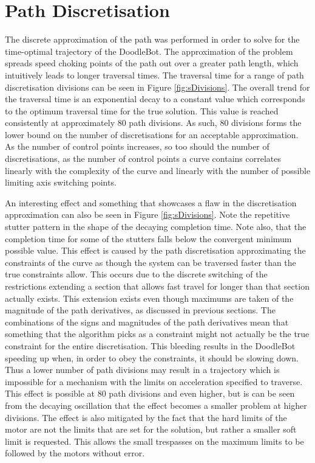 \section{Path Discretisation}
The discrete approximation of the path was performed in order to solve for the time-optimal trajectory of the DoodleBot. The approximation of the problem spreads speed choking points of the path out over a greater path length, which intuitively leads to longer traversal times. The traversal time for a range of path discretisation divisions can be seen in Figure \ref{fig:sDivisions}. The overall trend for the traversal time is an exponential decay to a constant value which corresponds to the optimum traversal time for the true solution. This value is reached consistently at approximately 80 path divisions. As such, 80 divisions forms the lower bound on the number of discretisations for an acceptable approximation. As the number of control points increases, so too should the number of discretisations, as the number of control points a curve contains correlates linearly with the complexity of the curve and linearly with the number of possible limiting axis switching points.

An interesting effect and something that showcases a flaw in the discretisation approximation can also be seen in Figure \ref{fig:sDivisions}. Note the repetitive stutter pattern in the shape of the decaying completion time. Note also, that the completion time for some of the stutters falls below the convergent minimum possible value. This effect is caused by the path discretisation approximating the constraints of the curve as though the system can be traversed faster than the true constraints allow. This occurs due to the discrete switching of the restrictions extending a section that allows fast travel for longer than that section actually exists. This extension exists even though maximums are taken of the magnitude of the path derivatives, as discussed in previous sections. The combinations of the signs and magnitudes of the path derivatives mean that something that the algorithm picks as a constraint might not actually be the true constraint for the entire discretisation. This bleeding results in the DoodleBot speeding up when, in order to obey the constraints, it should be slowing down. Thus a lower number of path divisions may result in a trajectory which is impossible for a mechanism with the limits on acceleration specified to traverse. This effect is possible at 80 path divisions and even higher, but is can be seen from the decaying oscillation that the effect becomes a smaller problem at higher divisions. The effect is also mitigated by the fact that the hard limits of the motor are not the limits that are set for the solution, but rather a smaller soft limit is requested. This allows the small trespasses on the maximum limits to be followed by the motors without error.


